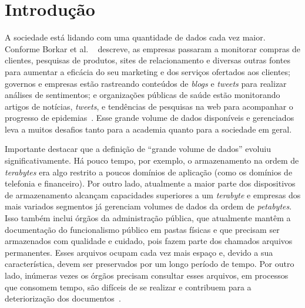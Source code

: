 \chapter{Introdução}
A sociedade está lidando com uma quantidade de dados cada vez maior. 
Conforme Borkar et al. ~\cite{WNextBigData} descreve, as empresas passaram a monitorar compras de clientes, pesquisas de produtos, sites de relacionamento e diversas outras fontes para aumentar a eficácia do seu marketing e dos serviços ofertados aos clientes; governos e empresas estão rastreando conteúdos de \textit{blogs} e \textit{tweets} para realizar análises de sentimentos; e organizações públicas de saúde estão monitorando artigos de notícias, \textit{tweets}, e tendências de pesquisas na web para acompanhar o progresso de epidemias~\cite{WNextBigData}. Esse grande volume de dados disponíveis e gerenciados leva a muitos desafios tanto para a academia quanto para a sociedade em geral.

Importante destacar que a definição de ``grande volume de dados'' evoluiu significativamente. Há pouco tempo, por exemplo, o armazenamento na ordem de \emph{terabytes} era algo restrito a poucos domínios de aplicação (como os domínios de telefonia e financeiro). Por outro lado, atualmente a maior parte dos dispositivos de armazenamento alcançam capacidades superiores a um \emph{terabyte} e  empresas dos mais variados segmentos já gerenciam volumes de dados da ordem de \emph{petabytes}.
Isso também inclui órgãos da administração pública, que atualmente mantêm a documentação do funcionalismo público em pastas físicas e que precisam ser armazenados com qualidade e cuidado, pois fazem parte dos chamados arquivos permanentes. Esses arquivos ocupam cada vez mais espaço e, devido a sua característica, devem ser preservados por um longo período de tempo. Por outro lado, inúmeras vezes os órgãos precisam consultar esses arquivos, em processos que consomem tempo, são difíceis de se realizar e contribuem para a deteriorização dos documentos~\cite{arqConarq}.

